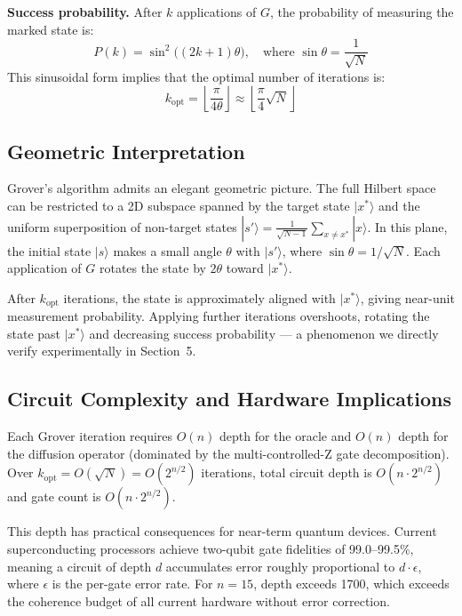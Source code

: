 \documentclass[sigconf, authorversion=true, nonacm=true]{acmart}
\begin{document}
\textbf{Success probability.} After $k$ applications of $G$, the probability of measuring the marked state is:
\[
P(k) = \sin^2\!\bigl((2k+1)\theta\bigr), \quad \text{where } \sin\theta = \frac{1}{\sqrt{N}}
\]
This sinusoidal form implies that the optimal number of iterations is:
\[
k_{\text{opt}} = \left\lfloor \frac{\pi}{4\theta} \right\rfloor \approx \left\lfloor \frac{\pi}{4}\sqrt{N} \right\rfloor
\]

\subsection{Geometric Interpretation}

Grover's algorithm admits an elegant geometric picture. The full Hilbert space can be restricted to a 2D subspace spanned by the target state $|x^*\rangle$ and the uniform superposition of non-target states $|s'\rangle = \frac{1}{\sqrt{N-1}}\sum_{x \neq x^*}|x\rangle$. In this plane, the initial state $|s\rangle$ makes a small angle $\theta$ with $|s'\rangle$, where $\sin\theta = 1/\sqrt{N}$. Each application of $G$ rotates the state by $2\theta$ toward $|x^*\rangle$.

After $k_{\text{opt}}$ iterations, the state is approximately aligned with $|x^*\rangle$, giving near-unit measurement probability. Applying further iterations overshoots, rotating the state past $|x^*\rangle$ and decreasing success probability — a phenomenon we directly verify experimentally in Section~5.

\subsection{Circuit Complexity and Hardware Implications}

Each Grover iteration requires $O(n)$ depth for the oracle and $O(n)$ depth for the diffusion operator (dominated by the multi-controlled-Z gate decomposition). Over $k_{\text{opt}} = O(\sqrt{N}) = O(2^{n/2})$ iterations, total circuit depth is $O(n \cdot 2^{n/2})$ and gate count is $O(n \cdot 2^{n/2})$.

This depth has practical consequences for near-term quantum devices. Current superconducting processors achieve two-qubit gate fidelities of 99.0--99.5\%, meaning a circuit of depth $d$ accumulates error roughly proportional to $d \cdot \epsilon$, where $\epsilon$ is the per-gate error rate. For $n=15$, depth exceeds 1700, which exceeds the coherence budget of all current hardware without error correction.
\end{document}
